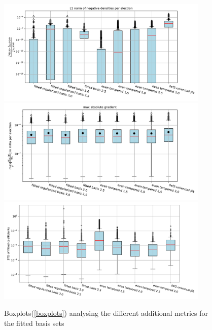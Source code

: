     \begin{figure}
    \centering
    \includegraphics[width=0.9\textwidth]{chapters/results/results_images/L1_negative_densities_on_hartree+external_MOFDFT_for_different_basis_sets}
    \includegraphics[width=0.9\textwidth]{chapters/results/results_images/max_abs_gradient_on_hartree+external_MOFDFT_for_different_basis_sets}
    \includegraphics[width=0.9\textwidth]{chapters/results/results_images/var_basis_sets}
    \caption{Boxplots(\ref{boxplots}) analysing the different additional metrics for the fitted basis sets}
\end{figure}


